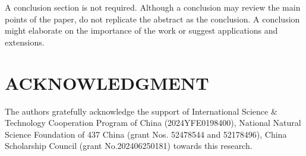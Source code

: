 \documentclass[a4paper, 10pt, conference]{ieeeconf}      %
\begin{document}
A conclusion section is not required. Although a conclusion may review the main points of the paper, do not replicate the abstract as the conclusion. A conclusion might elaborate on the importance of the work or suggest applications and extensions. 

\addtolength{\textheight}{-12cm}   %









\section*{ACKNOWLEDGMENT}

The authors gratefully acknowledge the support of International Science \& Technology Cooperation Program of China (2024YFE0198400), National Natural Science Foundation of 437 China (grant Nos. 52478544 and 52178496),
China Scholarship Council (grant No.202406250181) towards this research.



 

\end{document}

